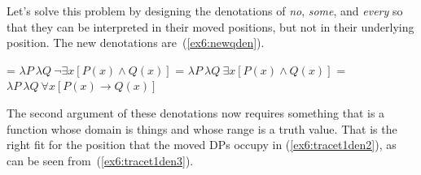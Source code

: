 Let's solve this problem by designing the denotations of \emph{no}, \emph{some}, and \emph{every} so that they can be interpreted in their moved positions, but not in their underlying position. The new denotations are~(\ref{ex6:newqden}).
\begin{exe}
\raggedright
	\ex \label{ex6:newqden}
	\begin{xlist}
		\ex {} = $\lambda P\ \lambda Q\ \neg\exists x [P(x) \wedge Q(x)]$
		\ex {} = $\lambda P\ \lambda Q\ \exists x [P(x) \wedge Q(x)]$
		\ex {} = $\lambda P\ \lambda Q\ \forall x [P(x) \rightarrow Q(x)]$
	\end{xlist}	
\end{exe}
The second argument of these denotations now requires something that is a function whose domain is things and whose range is a truth value. That is the right fit for the position that the moved DPs occupy in (\ref{ex6:tracet1den2}), as can be seen from~(\ref{ex6:tracet1den3}).
\medskip

